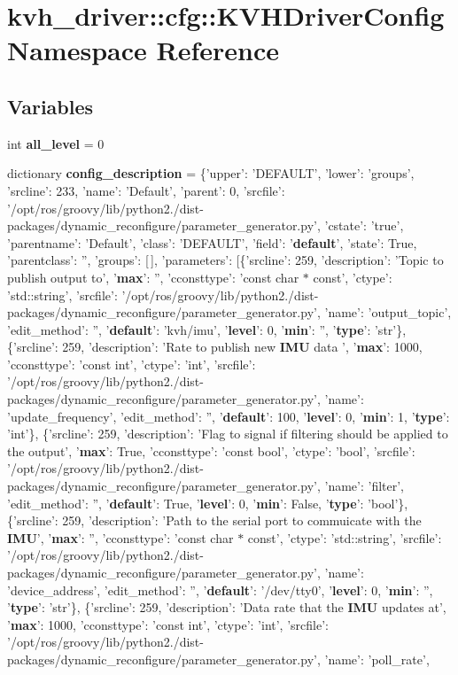 \section{kvh\-\_\-driver\-:\-:cfg\-:\-:\-K\-V\-H\-Driver\-Config \-Namespace \-Reference}
\label{namespacekvh__driver_1_1cfg_1_1KVHDriverConfig}
\subsection*{\-Variables}
\begin{DoxyCompactItemize}
\item 
int {\bf all\-\_\-level} = 0
\item 
dictionary {\bf config\-\_\-description} = \{'upper'\-: '\-D\-E\-F\-A\-U\-L\-T', 'lower'\-: 'groups', 'srcline'\-: 233, 'name'\-: '\-Default', 'parent'\-: 0, 'srcfile'\-: '/opt/ros/groovy/lib/python2./dist-\/packages/dynamic\-\_\-reconfigure/parameter\-\_\-generator.\-py', 'cstate'\-: 'true', 'parentname'\-: '\-Default', 'class'\-: '\-D\-E\-F\-A\-U\-L\-T', 'field'\-: '{\bf default}', 'state'\-: \-True, 'parentclass'\-: '', 'groups'\-: [$\,$], 'parameters'\-: [\{'srcline'\-: 259, 'description'\-: '\-Topic to publish output to', '{\bf max}'\-: '', 'cconsttype'\-: 'const char $\ast$ const', 'ctype'\-: 'std\-::string', 'srcfile'\-: '/opt/ros/groovy/lib/python2./dist-\/packages/dynamic\-\_\-reconfigure/parameter\-\_\-generator.\-py', 'name'\-: 'output\-\_\-topic', 'edit\-\_\-method'\-: '', '{\bf default}'\-: 'kvh/imu', '{\bf level}'\-: 0, '{\bf min}'\-: '', '{\bf type}'\-: 'str'\}, \{'srcline'\-: 259, 'description'\-: '\-Rate to publish new {\bf \-I\-M\-U} data ', '{\bf max}'\-: 1000, 'cconsttype'\-: 'const int', 'ctype'\-: 'int', 'srcfile'\-: '/opt/ros/groovy/lib/python2./dist-\/packages/dynamic\-\_\-reconfigure/parameter\-\_\-generator.\-py', 'name'\-: 'update\-\_\-frequency', 'edit\-\_\-method'\-: '', '{\bf default}'\-: 100, '{\bf level}'\-: 0, '{\bf min}'\-: 1, '{\bf type}'\-: 'int'\}, \{'srcline'\-: 259, 'description'\-: '\-Flag to signal if filtering should be applied to the output', '{\bf max}'\-: \-True, 'cconsttype'\-: 'const bool', 'ctype'\-: 'bool', 'srcfile'\-: '/opt/ros/groovy/lib/python2./dist-\/packages/dynamic\-\_\-reconfigure/parameter\-\_\-generator.\-py', 'name'\-: 'filter', 'edit\-\_\-method'\-: '', '{\bf default}'\-: \-True, '{\bf level}'\-: 0, '{\bf min}'\-: \-False, '{\bf type}'\-: 'bool'\}, \{'srcline'\-: 259, 'description'\-: '\-Path to the serial port to commuicate with the {\bf \-I\-M\-U}', '{\bf max}'\-: '', 'cconsttype'\-: 'const char $\ast$ const', 'ctype'\-: 'std\-::string', 'srcfile'\-: '/opt/ros/groovy/lib/python2./dist-\/packages/dynamic\-\_\-reconfigure/parameter\-\_\-generator.\-py', 'name'\-: 'device\-\_\-address', 'edit\-\_\-method'\-: '', '{\bf default}'\-: '/dev/tty0', '{\bf level}'\-: 0, '{\bf min}'\-: '', '{\bf type}'\-: 'str'\}, \{'srcline'\-: 259, 'description'\-: '\-Data rate that the {\bf \-I\-M\-U} updates at', '{\bf max}'\-: 1000, 'cconsttype'\-: 'const int', 'ctype'\-: 'int', 'srcfile'\-: '/opt/ros/groovy/lib/python2./dist-\/packages/dynamic\-\_\-reconfigure/parameter\-\_\-generator.\-py', 'name'\-: 'poll\-\_\-rate', 
\end{DoxyCompactItemize}
